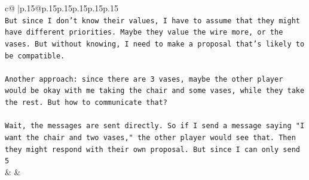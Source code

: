\documentclass{article}
\begin{document}
{\begin{supertabular}{c@{$\;$}|p{.15\linewidth}@{}p{.15\linewidth}p{.15\linewidth}p{.15\linewidth}p{.15\linewidth}p{.15\linewidth}}
{{{\\ 
\texttt{But since I don't know their values, I have to assume that they might have different priorities. Maybe they value the wire more, or the vases. But without knowing, I need to make a proposal that's likely to be compatible.} \\
\\ 
\texttt{Another approach: since there are 3 vases, maybe the other player would be okay with me taking the chair and some vases, while they take the rest. But how to communicate that?} \\
\\ 
\texttt{Wait, the messages are sent directly. So if I send a message saying "I want the chair and two vases," the other player would see that. Then they might respond with their own proposal. But since I can only send 5} \\
            }
        }
    }
    & & \\ \\


\end{supertabular}}
\end{document}
